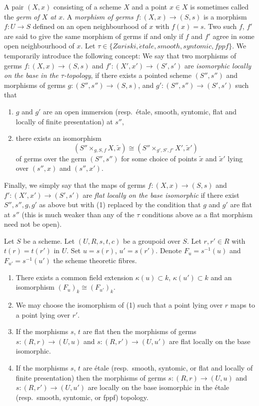 \medskip\noindent
A pair $(X, x)$ consisting of a scheme $X$ and a point $x \in X$ is sometimes
called the {\it germ of $X$ at $x$}.
A {\it morphism of germs} $f : (X, x) \to (S, s)$
is a morphism $f : U \to S$ defined on an open neighbourhood
of $x$ with $f(x) = s$. Two such
$f$, $f'$ are said to give the same morphism of germs
if and only if $f$ and $f'$ agree in some open neighbourhood of $x$.
Let $\tau \in \{Zariski, \acute{e}tale, smooth, syntomic, fppf\}$.
We temporarily introduce the following concept: We say that two morphisms
of germs $f : (X, x) \to (S, s)$ and $f' : (X', x') \to (S', s')$
are {\it isomorphic locally on the base in the $\tau$-topology},
if there exists a pointed scheme $(S'', s'')$ and morphisms of germs
$g : (S'', s'') \to (S, s)$, and $g' : (S'', s'') \to (S', s')$
such that
\begin{enumerate}
\item $g$ and $g'$ are an open immersion (resp.\ \'etale, smooth, syntomic,
flat and locally of finite presentation) at $s''$,
\item there exists an isomorphism
$$
(S'' \times_{g, S, f} X, \tilde x)
\cong
(S'' \times_{g', S', f'} X', \tilde  x')
$$
of germs over the germ $(S'', s'')$ for some choice of points
$\tilde x$ and $\tilde x'$ lying over $(s'', x)$ and $(s'', x')$.
\end{enumerate}
Finally, we simply say that the maps of germs
$f : (X, x) \to (S, s)$ and $f' : (X', x') \to (S', s')$
are {\it flat locally on the base isomorphic} if there exist
$S'', s'', g, g'$ as above but with (1) replaced by
the condition that $g$ and $g'$ are flat at $s''$ (this is
much weaker than any of the $\tau$ conditions above
as a flat morphism need not be open).

\begin{lemma}
\label{lemma-two-fibres}
Let $S$ be a scheme.
Let $(U, R, s, t, c)$ be a groupoid over $S$.
Let $r, r' \in R$ with $t(r) = t(r')$ in $U$.
Set $u = s(r)$, $u' = s(r')$.
Denote $F_u = s^{-1}(u)$ and $F_{u'} = s^{-1}(u')$ the scheme
theoretic fibres.
\begin{enumerate}
\item There exists a common field extension
$\kappa(u) \subset k$, $\kappa(u') \subset k$ and
an isomorphism $(F_u)_k \cong (F_{u'})_k$.
\item We may choose the isomorphism of (1) such that a point
lying over $r$ maps to a point lying over $r'$.
\item If the morphisms $s$, $t$ are flat then the morphisms of germs
$s : (R, r) \to (U, u)$ and $s : (R, r') \to (U, u')$ are flat
locally on the base isomorphic.
\item If the morphisms $s$, $t$ are \'etale
(resp.\ smooth, syntomic, or flat and locally of finite presentation)
then the morphisms of germs $s : (R, r) \to (U, u)$ and
$s : (R, r') \to (U, u')$ are locally on the base isomorphic
in the \'etale (resp.\ smooth, syntomic, or fppf) topology.
\end{enumerate}
\end{lemma}

